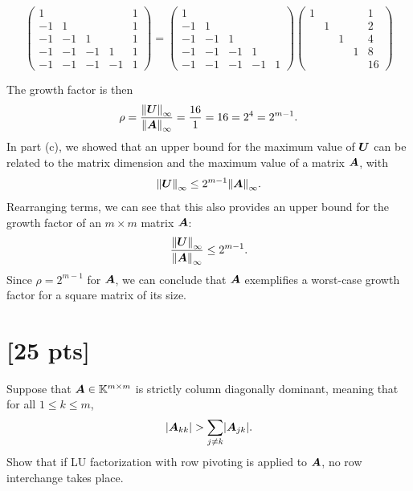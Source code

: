 \documentclass[twoside,10pt]{article}
\begin{document}
\begin{equation}
  \begin{pmatrix}
    1  &    &   &       & 1 \\
    -1 & 1  &   &       & 1 \\
    -1 & -1 & 1 &       & 1 \\
    -1 & -1 & -1 &    1 & 1 \\
    -1 & -1 & -1 &  - 1 & 1 
  \end{pmatrix}
  =
  \begin{pmatrix}
    1  &    &   &        \\
    -1 & 1  &   &        \\
    -1 & -1 & 1 &        \\
    -1 & -1 & -1 &    1  \\
    -1 & -1 & -1 &  - 1 & 1 
  \end{pmatrix}
  \begin{pmatrix}
    1  &   &   &   & 1 \\
       & 1 &   &   & 2 \\
       &   & 1 &   & 4 \\
       &   &   & 1 & 8 \\
       &   &   &   & 16 
  \end{pmatrix}
\end{equation}

The growth factor is then
$$\rho = \dfrac{\left\| \mtx{U} \right\|_{\infty}}{\left\|\mtx{A}\right\|_{\infty}} = \dfrac{16}{1} = 16 = 2^4 = 2^{m - 1}.$$
In part (c), we showed that an upper bound for the maximum value of $\bm{U}$ can be related to the matrix dimension and the maximum value of a matrix $\bm{A}$, with
$$\left\|\mtx{U}\right\|_{\infty} \leq 2^{m - 1} \left\| \mtx{A}\right\|_{\infty}.$$
Rearranging terms, we can see that this also provides an upper bound for the growth factor of an $m \times m$ matrix $\bm{A}$:
$$\dfrac{\left\|\mtx{U}\right\|_{\infty}}{\left\| \mtx{A}\right\|_{\infty}} \leq 2^{m - 1}.$$
Since $\rho = 2^{m-1}$ for $\bm{A}$, we can conclude that $\bm{A}$ exemplifies a worst-case growth factor for a square matrix of its size.

\section{[25 pts]}
Suppose that $\bm{A} \in \mathbb{K}^{m \times m}$ is strictly column diagonally dominant, meaning that for all $1 \leq k \leq m$, 
\begin{equation}
  \left|\mtx{A}_{kk}\right| > \sum \limits_{j \neq k} \left|\mtx{A}_{jk}\right|.
\end{equation}
Show that if LU factorization with row pivoting is applied to $\bm{A}$, no row interchange takes place.
\end{document}
